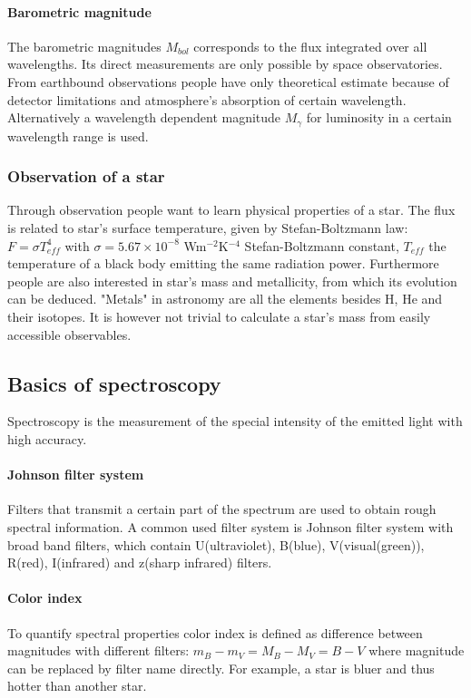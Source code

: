 \paragraph{Barometric magnitude}
The barometric magnitudes  $M_{bol}$ corresponds to the flux integrated over all wavelengths. Its direct measurements are only possible by space observatories. From earthbound observations people have only theoretical estimate because of detector limitations and atmosphere's absorption of certain wavelength. Alternatively a wavelength dependent magnitude $M_{\gamma}$ for luminosity in a certain wavelength range is used.

\subsubsection{Observation of a star}
Through observation people want to learn physical properties of a star. The flux is related to star's surface temperature, given by Stefan-Boltzmann law: $F=\sigma T_{eff}^4$ with $\sigma = 5.67\times10^{-8}$ Wm$^{-2}$K$^{-4}$ Stefan-Boltzmann constant, $T_{eff}$ the temperature of a black body emitting the same radiation power. Furthermore people are also interested in star's mass and metallicity, from which its evolution can be deduced. "Metals" in astronomy are all the elements besides H, He and their isotopes. It is however not trivial to calculate a star's mass from easily accessible observables.

\subsection{Basics of spectroscopy}
Spectroscopy is the measurement of the special intensity of the emitted light with high accuracy. 
\paragraph{Johnson filter system}
Filters that transmit a certain part of the spectrum are used to obtain rough spectral information. A common used filter system is Johnson filter system with broad band filters, which contain U(ultraviolet), B(blue), V(visual(green)), R(red), I(infrared) and z(sharp infrared) filters.
\paragraph{Color index}
To quantify spectral properties color index is defined as difference between magnitudes with different filters: $m_B-m_V=M_B-M_V=B-V$ where magnitude can be replaced by filter name directly. For example, a star is bluer and thus hotter than another star.
